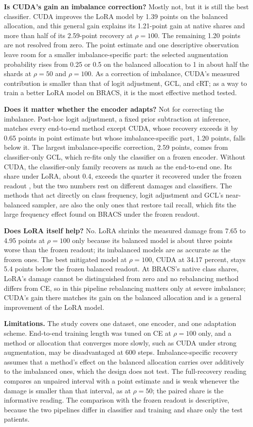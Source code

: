 \textbf{Is CUDA's gain an imbalance correction?} Mostly not, but it is still the best classifier. CUDA improves the LoRA model by 1.39 points on the balanced allocation, and this general gain explains its 1.21-point gain at native shares and more than half of its 2.59-point recovery at $\rho=100$. The remaining 1.20 points are not resolved from zero. The point estimate and one descriptive observation leave room for a smaller imbalance-specific part: the selected augmentation probability rises from 0.25 or 0.5 on the balanced allocation to 1 in about half the shards at $\rho=50$ and $\rho=100$. As a correction of imbalance, CUDA's measured contribution is smaller than that of logit adjustment, GCL, and cRT; as a way to train a better LoRA model on BRACS, it is the most effective method tested.

\textbf{Does it matter whether the encoder adapts?} Not for correcting the imbalance. Post-hoc logit adjustment, a fixed prior subtraction at inference, matches every end-to-end method except CUDA, whose recovery exceeds it by 0.65 points in point estimate but whose imbalance-specific part, 1.20 points, falls below it. The largest imbalance-specific correction, 2.59 points, comes from classifier-only GCL, which re-fits only the classifier on a frozen encoder. Without CUDA, the classifier-only family recovers as much as the end-to-end one. Its share under LoRA, about 0.4, exceeds the quarter it recovered under the frozen readout \citep{queisler2026causeBracs}, but the two numbers rest on different damages and classifiers. The methods that act directly on class frequency, logit adjustment and GCL's near-balanced sampler, are also the only ones that restore tail recall, which fits the large frequency effect found on BRACS under the frozen readout.

\textbf{Does LoRA itself help?} No. LoRA shrinks the measured damage from 7.65 to 4.95 points at $\rho=100$ only because its balanced model is about three points worse than the frozen readout; its imbalanced models are as accurate as the frozen ones. The best mitigated model at $\rho=100$, CUDA at 34.17 percent, stays 5.4 points below the frozen balanced readout. At BRACS's native class shares, LoRA's damage cannot be distinguished from zero and no rebalancing method differs from CE, so in this pipeline rebalancing matters only at severe imbalance; CUDA's gain there matches its gain on the balanced allocation and is a general improvement of the LoRA model.

\textbf{Limitations.} The study covers one dataset, one encoder, and one adaptation scheme. End-to-end training length was tuned on CE at $\rho=100$ only, and a method or allocation that converges more slowly, such as CUDA under strong augmentation, may be disadvantaged at 600 steps. Imbalance-specific recovery assumes that a method's effect on the balanced allocation carries over additively to the imbalanced ones, which the design does not test. The full-recovery reading compares an unpaired interval with a point estimate and is weak whenever the damage is smaller than that interval, as at $\rho=50$; the paired share is the informative reading. The comparison with the frozen readout is descriptive, because the two pipelines differ in classifier and training and share only the test patients.
